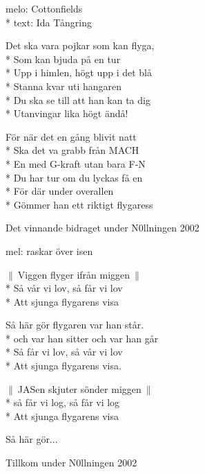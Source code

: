 \begin{SongText}
    \begin{SongInfo}
        melo: Cottonfields\\*%
        text: Ida Tångring    
    \end{SongInfo}
    \begin{SongVerse}
        Det ska vara pojkar som kan flyga,\\*%
        Som kan bjuda på en tur\\*%
        Upp i himlen, högt upp i det blå\\*%
        Stanna kvar uti hangaren\\*%
        Du ska se till att han kan ta dig\\*%
        Utanvingar lika högt ändå!
    \end{SongVerse}
    \begin{SongVerse}
        För när det en gång blivit natt\\*%
        Ska det va grabb från MACH\\*%
        En med G-kraft utan bara F-N\\*%
        Du har tur om du lyckas få en\\*%
        För där under overallen\\*%
        Gömmer han ett riktigt flygaress
    \end{SongVerse}
    \begin{SongInfo}
        Det vinnande bidraget under N0llningen 2002
    \end{SongInfo}
\end{SongText}
\begin{SongText}[Flygarvisan]
    \begin{SongInfo}
        mel: raskar över isen
    \end{SongInfo}
    \begin{SongVerse}
        $\|\:$Viggen flyger ifrån miggen$\:\|$\\*%
        Så vår vi lov, så får vi lov\\*%
        Att sjunga flygarens visa
    \end{SongVerse}
    \begin{SongVerse}
        Så här gör flygaren var han står.\\*%
        och var han sitter och var han går\\*%
        Så får vi lov, så vår vi lov\\*%
        Att sjunga flygarens visa.
    \end{SongVerse}
    \begin{SongVerse}
        $\|\:$JASen skjuter sönder miggen$\:\|$\\*%
        så får vi log, så får vi log\\*%
        Att sjunga flygarens visa
    \end{SongVerse}
    \begin{SongVerse}
        Så här gör...
    \end{SongVerse}
    \begin{SongInfo}
        Tillkom under N0llningen 2002
    \end{SongInfo}
\end{SongText}
